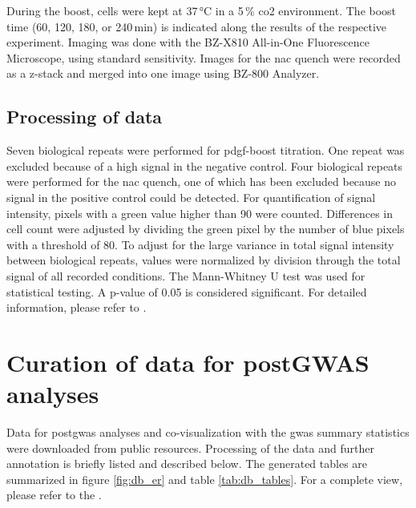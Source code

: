     During the boost, cells were kept at 37\,°C in a 5\,\% \ac{co2} environment. The boost time (60, 120, 180, or 240\,min) is indicated along the results of the respective experiment. Imaging was done with the BZ-X810 All-in-One Fluorescence Microscope, using standard sensitivity. Images for the \acf{nac} quench were recorded as a z-stack and merged into one image using BZ-800 Analyzer.

    \subsection{Processing of data}
    \label{subsec:cellrox_data_processing}
    Seven biological repeats were performed for \ac{pdgf}-boost titration. One repeat was excluded because of a high signal in the negative control. Four biological repeats were performed for the \ac{nac} quench, one of which has been excluded because no signal in the positive control could be detected.
    For quantification of signal intensity, pixels with a green value higher than 90 were counted. Differences in cell count were adjusted by dividing the green pixel by the number of blue pixels with a threshold of 80. To adjust for the large variance in total signal intensity between biological repeats, values were normalized by division through the total signal of all recorded conditions.
    The Mann-Whitney U test was used for statistical testing. A p-value of 0.05 is considered significant. For detailed information, please refer to .

\section{Curation of data for postGWAS analyses}
\label{sec:database}
Data for post\ac{gwas} analyses and co-visualization with the \ac{gwas} summary statistics were downloaded from public resources. Processing of the data and further annotation is briefly listed and described below. The generated tables are summarized in figure \ref{fig:db_er} and table \ref{tab:db_tables}. For a complete view, please refer to the .

